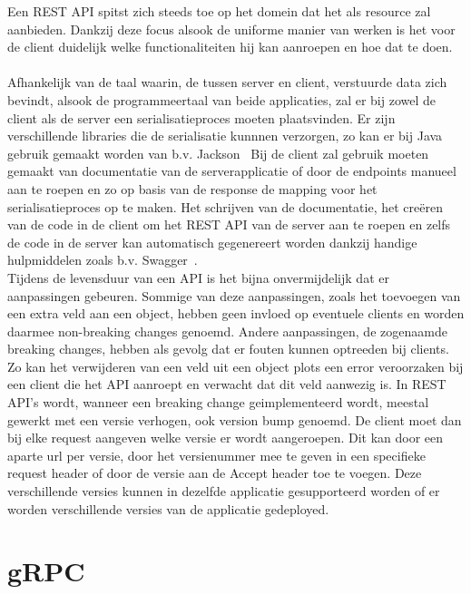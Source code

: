 Een REST API spitst zich steeds toe op het domein dat het als resource zal aanbieden.
Dankzij deze focus alsook de uniforme manier van werken is het voor de client duidelijk welke functionaliteiten hij kan aanroepen en hoe dat te doen.
~\autocite{jscrambler}
~\autocite{hubspot}
~\autocite{HTTP1.1vsHTTP2}\\

Afhankelijk van de taal waarin, de tussen server en client, verstuurde data zich bevindt, alsook de programmeertaal van beide applicaties,
zal er bij zowel de client als de server een serialisatieproces moeten plaatsvinden. Er zijn verschillende libraries die de serialisatie kunnnen verzorgen,
zo kan er bij Java gebruik gemaakt worden van b.v. Jackson~\parencite{jackson} \newline
Bij de client zal gebruik moeten gemaakt van documentatie van de serverapplicatie of door de endpoints manueel aan te roepen
en zo op basis van de response de mapping voor het serialisatieproces op te maken. Het schrijven van de documentatie,
het creëren van de code in de client om het REST API van de server aan te roepen en zelfs de code in de server kan automatisch gegenereert worden dankzij
handige hulpmiddelen zoals b.v. Swagger~\parencite{swagger}.\\

Tijdens de levensduur van een API is het bijna onvermijdelijk dat er aanpassingen gebeuren. Sommige van deze aanpassingen, zoals het toevoegen van een extra veld aan een object,
hebben geen invloed op eventuele clients en worden daarmee non-breaking changes genoemd. Andere aanpassingen, de zogenaamde breaking changes, hebben als gevolg dat er
fouten kunnen optreeden bij clients. Zo kan het verwijderen van een veld uit een object plots een error veroorzaken bij
een client die het API aanroept en verwacht dat dit veld aanwezig is. In REST API's wordt, wanneer een breaking change geimplementeerd wordt,
meestal gewerkt met een versie verhogen, ook version bump genoemd. De client moet dan bij elke request aangeven welke versie er wordt aangeroepen.
Dit kan door een aparte url per versie, door het versienummer mee te geven in een specifieke request header of door de versie aan de Accept header toe te voegen.
Deze verschillende versies kunnen in dezelfde applicatie gesupporteerd worden of er worden verschillende versies van de applicatie gedeployed.
~\autocite{restversion}\\

\section{gRPC}

